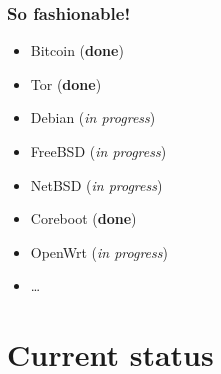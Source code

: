 \documentclass[14pt,aspectratio=169]{beamer}
\begin{document}
\begin{frame}
 \frametitle{So fashionable!}

 \begin{itemize}
 \item Bitcoin (\textbf{done})
 \item Tor (\textbf{done})
 \item Debian (\emph{in progress})
 \item FreeBSD (\emph{in progress})
 \item NetBSD (\emph{in progress})
 \item Coreboot (\textbf{done})
 \item OpenWrt (\emph{in progress})
 \item \ldots{}
\end{itemize}

\end{frame}

\begin{frame}[plain]
\end{frame}


\section{Current status}
\end{document}

